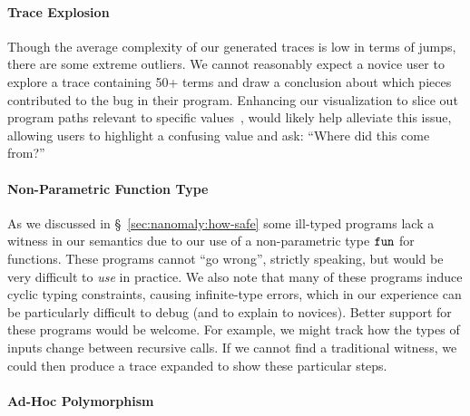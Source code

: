 \paragraph{Trace Explosion}
Though the average complexity of our generated traces is low in terms of
jumps, there are some extreme outliers.
%
We cannot reasonably expect a novice user to explore a trace containing
50+ terms and draw a conclusion about which pieces contributed to the
bug in their program.
%
Enhancing our visualization to slice out program paths relevant to
specific values~\cite{Perera2012-dy}, would likely help alleviate this
issue, allowing users to highlight a confusing value and ask: ``Where
did this come from?''

\paragraph{Non-Parametric Function Type}
As we discussed in \S~\ref{sec:nanomaly:how-safe} some ill-typed programs
lack a witness in our semantics due to our use of a non-parametric
type $\mathtt{fun}$ for functions.
%
These programs cannot ``go wrong'', strictly speaking, but would be very
difficult to \emph{use} in practice.
%
We also note that many of these programs induce cyclic typing constraints,
causing infinite-type errors, which in our experience can be particularly
difficult to debug (and to explain to novices).
%
Better support for these programs would be welcome.
%
For example, we might track how the types of inputs change between
recursive calls.
%
If we cannot find a traditional witness, we could then produce a trace
expanded to show these particular steps.

\paragraph{Ad-Hoc Polymorphism}

